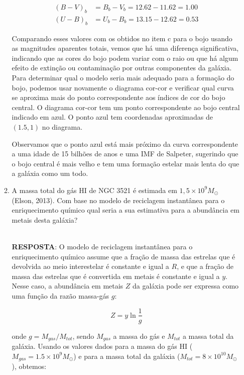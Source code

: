 \documentclass[a4paper,12pt]{article}
\begin{document}
\begin{enumerate}
\begin{enumerate}
\begin{align*}
(B-V)_b &= B_b - V_b = 12.62 - 11.62 = 1.00 \\
(U-B)_b &= U_b - B_b = 13.15 - 12.62 = 0.53
\end{align*}

Comparando esses valores com os obtidos no item c para o bojo usando as magnitudes aparentes totais, vemos que há uma diferença significativa, indicando que as cores do bojo podem variar com o raio ou que há algum efeito de extinção ou contaminação por outras componentes da galáxia. Para determinar qual o modelo seria mais adequado para a formação do bojo, podemos usar novamente o diagrama cor-cor e verificar qual curva se aproxima mais do ponto correspondente aos índices de cor do bojo central. O diagrama cor-cor tem um ponto correspondente ao bojo central indicado em azul. O ponto azul tem coordenadas aproximadas de $(1.5, 1)$ no diagrama.

Observamos que o ponto azul está mais próximo da curva correspondente a uma idade de 15 bilhões de anos e uma IMF de Salpeter, sugerindo que o bojo central é mais velho e tem uma formação estelar mais lenta do que a galáxia como um todo.

\noindent\hrulefill

\item A massa total do gás HI de NGC 3521 é estimada em $1,5 \times 10^9 M_\odot$ 
(Elson, 2013). Com base no modelo de reciclagem instantânea para o
enriquecimento químico qual seria a sua estimativa para a abundância 
em metais desta galáxia?

\noindent\hrulefill\\\textbf{RESPOSTA}: O modelo de reciclagem instantânea para o enriquecimento químico assume que a fração de massa das estrelas que é devolvida ao meio interestelar é constante e igual a $R$, e que a fração de massa das estrelas que é convertida em metais é constante e igual a $y$. Nesse caso, a abundância em metais $Z$ da galáxia pode ser expressa como uma função da razão massa-gás $g$:

\begin{equation*}
Z = y \ln \frac{1}{g}
\end{equation*}

onde $g = M_{gas}/M_{tot}$, sendo $M_{gas}$ a massa do gás e $M_{tot}$ a massa total da galáxia. Usando os valores dados para a massa do gás HI ($M_{gas}=1.5\times 10^9 M_\odot$) e para a massa total da galáxia ($M_{tot}=8\times 10^{10} M_\odot$), obtemos:


\end{enumerate}
\end{enumerate}
\end{document}
